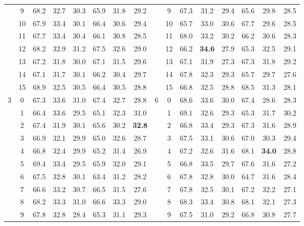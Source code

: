 \begin{table}[p]
{\begin{tabular}{c c | c c c | c c c || c c | c c c | c c c}
             & 9 & 68.2 & 32.7 & 30.3 & 65.9 & 31.8 & 29.2 &  & 9 & 67.3 & 31.2 & 29.4 & 65.6 & 29.8 & 28.5 \\
             & 10 & 67.9 & 33.4 & 30.1 & 66.4 & 30.6 & 29.4 &  & 10 & 65.7 & 33.0 & 30.6 & 67.7 & 29.6 & 28.5 \\
             & 11 & 67.7 & 33.4 & 30.4 & 66.1 & 30.8 & 28.5 &  & 11 & 68.0 & 33.2 & 30.2 & 66.2 & 30.6 & 28.3 \\
             & 12 & 68.2 & 32.9 & 31.2 & 67.5 & 32.6 & 29.0 &  & 12 & 66.2 & \textbf{34.6} & 27.9 & 65.3 & 32.5 & 29.1 \\
             & 13 & 67.2 & 31.8 & 30.0 & 67.1 & 31.5 & 29.6 &  & 13 & 67.1 & 31.9 & 27.3 & 67.3 & 31.8 & 29.2 \\
             & 14 & 67.1 & 31.7 & 30.1 & 66.2 & 30.4 & 29.7 &  & 14 & 67.8 & 32.3 & 29.3 & 65.7 & 29.7 & 27.6 \\
             & 15 & 68.9 & 32.5 & 30.5 & 66.4 & 30.5 & 28.8 &  & 15 & 66.8 & 32.5 & 28.8 & 68.5 & 31.3 & 28.1 \\
            \midrule
            \multirow{16}{*}{3} & 0 & 67.3 & 33.6 & 31.0 & 67.4 & 32.7 & 28.8 & \multirow{16}{*}{6} & 0 & 68.6 & 33.6 & 30.0 & 67.4 & 28.6 & 28.3 \\
             & 1 & 66.4 & 33.6 & 29.5 & 65.1 & 32.3 & 31.0 &  & 1 & 69.1 & 32.6 & 29.3 & 65.3 & 31.7 & 30.2 \\
             & 2 & 67.4 & 31.9 & 30.1 & 65.6 & 30.2 & \textbf{32.8} &  & 2 & 66.8 & 33.4 & 29.3 & 67.3 & 31.6 & 28.9 \\
             & 3 & 66.9 & 32.1 & 29.9 & 65.0 & 32.6 & 28.7 &  & 3 & 67.5 & 33.1 & 30.6 & 67.0 & 30.3 & 29.4 \\
             & 4 & 66.8 & 32.4 & 29.9 & 65.2 & 31.4 & 26.9 &  & 4 & 67.2 & 32.6 & 31.6 & 68.1 & \textbf{34.0} & 28.8 \\
             & 5 & 69.4 & 33.4 & 29.5 & 65.9 & 32.0 & 29.1 &  & 5 & 66.8 & 33.5 & 29.7 & 67.6 & 31.6 & 27.2 \\
             & 6 & 67.5 & 32.8 & 30.1 & 63.4 & 31.2 & 28.2 &  & 6 & 67.8 & 32.8 & 30.0 & 64.7 & 31.6 & 28.4 \\
             & 7 & 66.6 & 33.2 & 30.7 & 66.5 & 31.5 & 27.6 &  & 7 & 67.8 & 32.5 & 30.1 & 67.2 & 32.2 & 27.1 \\
             & 8 & 68.2 & 33.3 & 31.0 & 66.6 & 33.3 & 29.0 &  & 8 & 68.3 & 33.4 & 30.8 & 68.1 & 32.1 & 27.3 \\
             & 9 & 67.8 & 32.8 & 28.4 & 65.3 & 31.1 & 29.3 &  & 9 & 67.5 & 31.0 & 29.2 & 66.8 & 30.8 & 27.7 \\

\end{tabular}}
\end{table}
